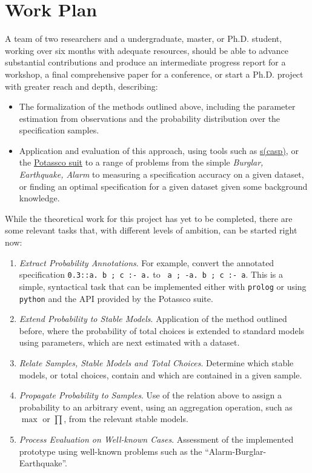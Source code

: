 \documentclass[a4paper]{article}
\begin{document}
\section{Work Plan}

A team of two researchers and a undergraduate, master, or Ph.D. student, working over six months with adequate resources, should be able to advance substantial contributions and produce an intermediate progress report for a workshop, a final comprehensive paper for a conference, or start a Ph.D. project with greater reach and depth, describing:

\begin{itemize}
    \item The formalization of the methods outlined above, including the parameter estimation from observations and the probability distribution over the specification samples.
    \item Application and evaluation of this approach, using tools such as \hyperlink{https://ciao-lang.org/playground/scasp.html}{s(casp)}, or the \hyperlink{https://potassco.org/}{Potassco suit} to a range of problems from the simple \textit{Burglar, Earthquake, Alarm} to measuring a specification accuracy on a given dataset, or finding an optimal specification for a given dataset given some background knowledge. 
\end{itemize}

While the theoretical work for this project has yet to be completed, there are some relevant tasks that, with different levels of ambition, can be started right now: 
\begin{enumerate}
    \item \textit{Extract Probability Annotations}. For example, convert the annotated specification \verb!0.3::a. b ; c :- a.! to \verb! a ; -a. b ; c :- a!. This is a simple, syntactical task that can be implemented either with \texttt{prolog} or using \texttt{python} and the API provided by the Potassco suite.
    \item \textit{Extend Probability to Stable Models}. Application of the method outlined before, where the probability of total choices is extended to standard models using parameters, which are next estimated with a dataset.  
    \item \textit{Relate Samples, Stable Models and Total Choices}. Determine which stable models, or total choices, contain and which are contained in a given sample. 
    \item \textit{Propagate Probability to Samples}. Use of the relation above to assign a probability to an arbitrary event, using an aggregation operation, such as $\max$ or $\prod$, from the relevant stable models.
    \item \textit{Process Evaluation on Well-known Cases}. Assessment of the implemented prototype using well-known problems such as the ``A\-larm-Bur\-glar-Earth\-qua\-ke''. 
\end{enumerate} 
 
\end{document}

